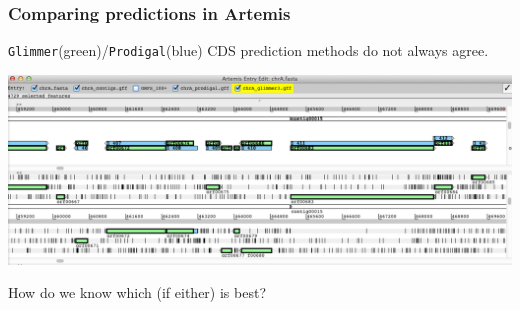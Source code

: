 \begin{frame}
  \frametitle{Comparing predictions in Artemis}
  \texttt{Glimmer}(green)/\texttt{Prodigal}(blue) CDS prediction methods do not always agree.
  \begin{center}
    \includegraphics[width=1\textwidth]{images/artemis_cdspred4}     
  \end{center}
  How do we know which (if either) is best?
\end{frame}